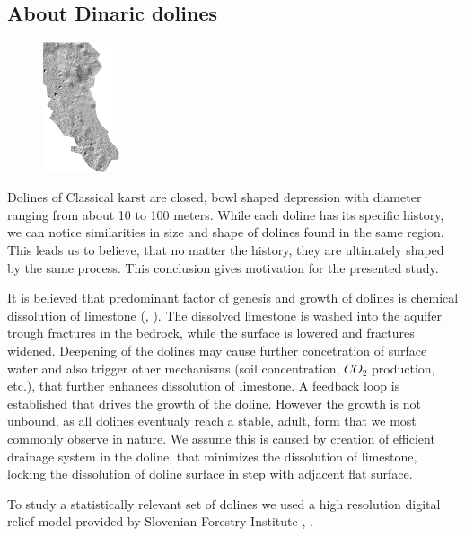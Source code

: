 \documentclass[a0,portrait]{a0poster}
\begin{document}
\begin{multicols}{2}
\section*{About Dinaric dolines}
\begin{figure}
\begin{center}
	\includegraphics[width=0.2\textwidth]{menisija-relief.png}
	\label{fig:menisija}
\end{center}
\end{figure}
Dolines of Classical karst are closed, bowl shaped depression with diameter ranging from about 10 to 100 meters. While each doline has its specific history, we can notice similarities in size and shape of dolines found in the same region. This leads us to believe, that no matter the history, they are ultimately shaped by the same process. This conclusion gives motivation for the presented study.

It is believed that predominant factor of genesis and growth of dolines is chemical dissolution of limestone (\cite{ford2007karst}, \cite{Zambo1997}). The dissolved limestone is washed into the aquifer trough fractures in the bedrock, while the surface is lowered and fractures widened. Deepening of the dolines may cause further concetration of surface water and also trigger other mechanisms (soil concentration, $CO_2$ production, etc.), that further enhances dissolution of limestone. A feedback loop is established that drives the growth of the doline. However the growth is not unbound, as all dolines eventualy reach a stable, adult, form that we most commonly observe in nature. We assume this is caused by creation of efficient drainage system in the doline, that minimizes the dissolution of limestone, locking the dissolution of doline surface in step with adjacent flat surface.

To study a statistically relevant set of dolines we used a high resolution digital relief model provided by Slovenian Forestry Institute \cite{LAK}, \cite{Kobler20079}.


\end{multicols}
\end{document}
